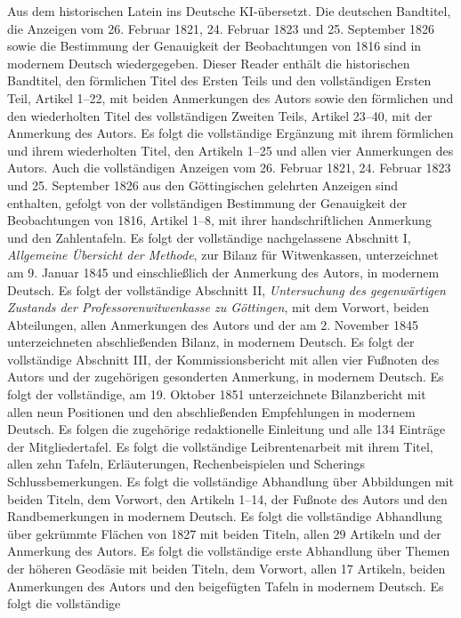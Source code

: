 \thispagestyle{empty}\begin{center}\vspace*{-.65in}{\Large\bfseries Carl Friedrich Gauss\par}\end{center}\smallskip\begingroup\small\setlength{\baselineskip}{9.9pt}\noindent Aus dem historischen Latein ins Deutsche KI-übersetzt. Die deutschen Bandtitel, die Anzeigen vom 26. Februar 1821, 24. Februar 1823 und 25. September 1826 sowie die Bestimmung der Genauigkeit der Beobachtungen von 1816 sind in modernem Deutsch wiedergegeben. Dieser Reader enthält die historischen Bandtitel, den förmlichen Titel des Ersten Teils und den vollständigen Ersten Teil, Artikel 1--22, mit beiden Anmerkungen des Autors sowie den förmlichen und den wiederholten Titel des vollständigen Zweiten Teils, Artikel 23--40, mit der Anmerkung des Autors. Es folgt die vollständige Ergänzung mit ihrem förmlichen und ihrem wiederholten Titel, den Artikeln 1--25 und allen vier Anmerkungen des Autors. Auch die vollständigen Anzeigen vom 26. Februar 1821, 24. Februar 1823 und 25. September 1826 aus den Göttingischen gelehrten Anzeigen sind enthalten, gefolgt von der vollständigen Bestimmung der Genauigkeit der Beobachtungen von 1816, Artikel 1--8, mit ihrer handschriftlichen Anmerkung und den Zahlentafeln. Es folgt der vollständige nachgelassene Abschnitt I, \textit{Allgemeine Übersicht der Methode}, zur Bilanz für Witwenkassen, unterzeichnet am 9. Januar 1845 und einschließlich der Anmerkung des Autors, in modernem Deutsch. Es folgt der vollständige Abschnitt II, \textit{Untersuchung des gegenwärtigen Zustands der Professorenwitwenkasse zu Göttingen}, mit dem Vorwort, beiden Abteilungen, allen Anmerkungen des Autors und der am 2. November 1845 unterzeichneten abschließenden Bilanz, in modernem Deutsch. Es folgt der vollständige Abschnitt III, der Kommissionsbericht mit allen vier Fußnoten des Autors und der zugehörigen gesonderten Anmerkung, in modernem Deutsch. Es folgt der vollständige, am 19. Oktober 1851 unterzeichnete Bilanzbericht mit allen neun Positionen und den abschließenden Empfehlungen in modernem Deutsch. Es folgen die zugehörige redaktionelle Einleitung und alle 134 Einträge der Mitgliedertafel. Es folgt die vollständige Leibrentenarbeit mit ihrem Titel, allen zehn Tafeln, Erläuterungen, Rechenbeispielen und Scherings Schlussbemerkungen. Es folgt die vollständige Abhandlung über Abbildungen mit beiden Titeln, dem Vorwort, den Artikeln 1--14, der Fußnote des Autors und den Randbemerkungen in modernem Deutsch. Es folgt die vollständige Abhandlung über gekrümmte Flächen von 1827 mit beiden Titeln, allen 29 Artikeln und der Anmerkung des Autors. Es folgt die vollständige erste Abhandlung über Themen der höheren Geodäsie mit beiden Titeln, dem Vorwort, allen 17 Artikeln, beiden Anmerkungen des Autors und den beigefügten Tafeln in modernem Deutsch. Es folgt die vollständige 